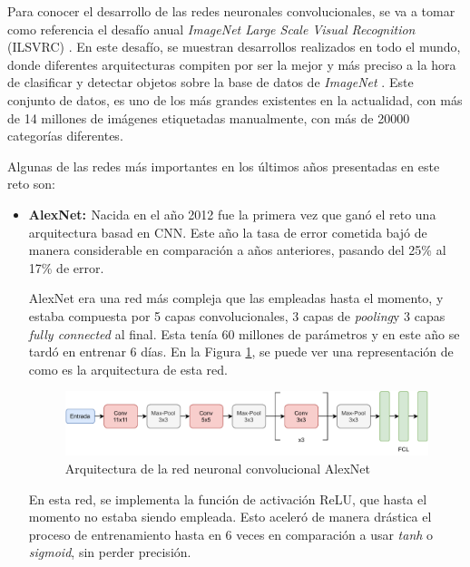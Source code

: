 Para conocer el desarrollo de las redes neuronales convolucionales, se va a tomar como referencia el desafío anual \textit{ImageNet Large Scale Visual Recognition} (ILSVRC) \cite{russakovsky2015imagenet}. En este desafío, se muestran desarrollos realizados en todo el mundo, donde diferentes arquitecturas compiten por ser la mejor y más preciso a la hora de clasificar y detectar objetos sobre la base de datos de \textit{ImageNet} \cite{5206848}. Este conjunto de datos, es uno de los más grandes existentes en la actualidad, con más de 14 millones de imágenes etiquetadas manualmente, con más de 20000 categorías diferentes. 

Algunas de las redes más importantes en los últimos años presentadas en este reto son:

\begin{itemize}
    \item \textbf{AlexNet: \cite{NIPS2012_c399862d}} Nacida en el año 2012 fue la primera vez que ganó el reto una arquitectura basad en CNN. Este año la tasa de error cometida bajó de manera considerable en comparación a años anteriores, pasando del 25\% al 17\% de error. 
    
    AlexNet era una red más compleja que las empleadas hasta el momento, y estaba compuesta por 5 capas convolucionales, 3 capas de \textit{pooling}y 3 capas \textit{fully connected} al final. Esta tenía 60 millones de parámetros y en este año se tardó en entrenar 6 días. En la Figura \ref{fig:alexnet}, se puede ver una representación de como es la arquitectura de esta red.\\
    
    \begin{figure}[!h]
        \centering
        \includegraphics[width=\textwidth]{figuras/desarrollo teorico/desarrollo_teorico-AlexNet.pdf}
        \caption{Arquitectura de la red neuronal convolucional AlexNet}
        \label{fig:alexnet}
    \end{figure}
    
    En esta red, se implementa la función de activación ReLU, que hasta el momento no estaba siendo empleada. Esto aceleró de manera drástica el proceso de entrenamiento hasta en 6 veces en comparación a usar \textit{tanh} o \textit{sigmoid}, sin perder precisión.
    

\end{itemize}
